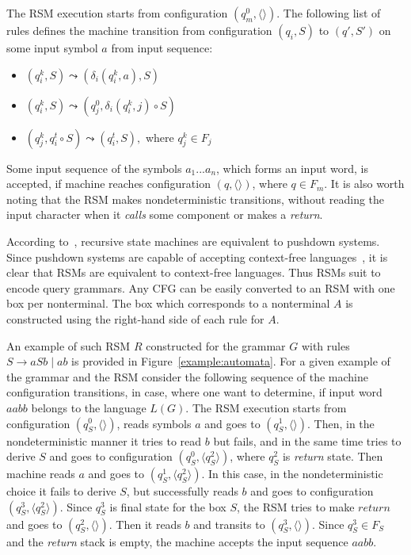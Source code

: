 The RSM execution starts from configuration $(q_m^0, \langle\rangle)$. 
The following list of rules defines the machine transition from configuration $(q_i,S)$ to $(q',S')$ on some input symbol $a$ from input sequence:

\begin{itemize}
    \item $(q_i^k,S) \leadsto (\delta_i (q_i^k, a),S)$
    \item $(q_i^k,S) \leadsto (q_j^0, \delta_i (q_i^k, j) \circ S)$
    \item $(q_j^k,q_i^t\circ S) \leadsto (q_i^t, S),$ where $q_j^k \in F_j$ 
\end{itemize}

Some input sequence of the symbols $a_1 ... a_n$, which forms an input word, is accepted, if machine reaches configuration $(q,\langle\rangle)$, where $q \in F_m$. It is also worth noting that the RSM makes nondeterministic transitions, without reading the input character when it \textit{calls} some component or  makes a \textit{return}.

According to~\cite{rsm:analysis:10.1007/3-540-44585-4_18}, recursive state machines are equivalent to pushdown systems.
Since pushdown systems are capable of accepting context-free languages~\cite{automata:theory:10.5555/1177300}, it is clear that RSMs are equivalent to context-free languages.
Thus RSMs suit to encode query grammars.
Any CFG can be easily converted to an RSM with one box per nonterminal.
The box which corresponds to a nonterminal $A$ is constructed using the right-hand side of each rule for $A$.

An example of such RSM $R$ constructed for the grammar $G$ with rules $S \to a S b \mid a b$ is provided in Figure~\ref{example:automata}. 
For a given example of the grammar and the RSM consider the following sequence of the machine configuration transitions, in case, where one want to determine, if input word $aabb$ belongs to the language $L(G)$. 
The RSM execution starts from configuration $(q_S^0,\langle \rangle)$, reads symbols $a$ and goes to $(q_S^1, \langle \rangle)$. 
Then, in the nondeterministic manner it tries to read $b$ but fails, and in the same time tries to derive $S$ and goes to configuration $(q_S^0, \langle q_S^2 \rangle)$, where $q_S^2$ is \textit{return} state. 
Then machine reads $a$ and goes to $(q_S^1, \langle q_S^2 \rangle)$. In this case, in the nondeterministic choice it fails to derive $S$, but successfully reads $b$ and goes to configuration $(q_S^3,\langle q_S^2 \rangle)$. 
Since $q_S^3$ is final state for the box $S$, the RSM tries to make $return$ and goes to $(q_S^2,\langle \rangle)$. 
Then it reads $b$ and transits to $(q_S^3,\langle \rangle)$. 
Since $q_S^3 \in F_S$ and the \textit{return} stack is empty, the machine accepts the input sequence $aabb$.


